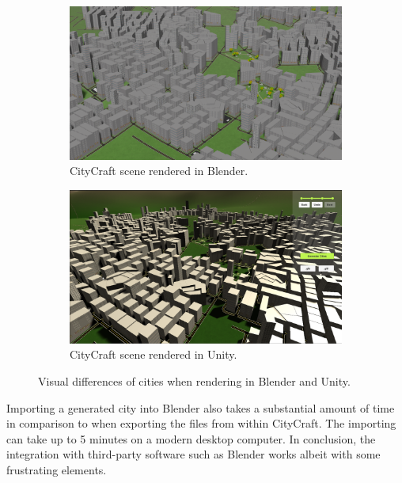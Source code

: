 \begin{figure}[H]
  \centering
  \begin{subfigure}[b]{0.45\textwidth}
    \includegraphics[width=\textwidth]{figure/blender_unity_comparison_blender}
    \caption{CityCraft scene rendered in Blender.}
  \end{subfigure}
  \quad
  \begin{subfigure}[b]{0.45\textwidth}
    \includegraphics[width=\textwidth]{figure/blender_unity_comparison_unity}
    \caption{CityCraft scene rendered in Unity.}
  \end{subfigure}
  \caption{Visual differences of cities when rendering in Blender and Unity.}
  \label{fig:blender_unity_comparison}
\end{figure}

Importing a generated city into Blender also takes a substantial amount of time in comparison to when exporting the files from within CityCraft.
The importing can take up to 5 minutes on a modern desktop computer.
In conclusion, the integration with third-party software such as Blender works albeit with some frustrating elements.

